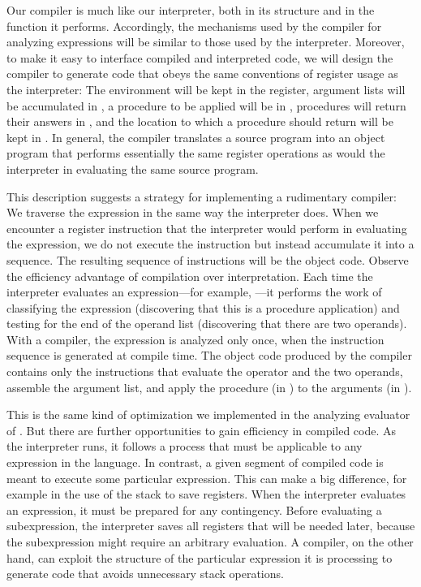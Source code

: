 Our compiler is much like our interpreter, both in its structure and in the function it performs.
Accordingly, the mechanisms used by the compiler for analyzing expressions will be similar to those used by the interpreter.
Moreover, to make it easy to interface compiled and interpreted code, we will design the compiler to generate code that obeys the same conventions of register usage as the interpreter:
The environment will be kept in the  register, argument lists will be accumulated in , a procedure to be applied will be in , procedures will return their answers in , and the location to which a procedure should return will be kept in .
In general, the compiler translates a source program into an object program that performs essentially the same register operations as would the interpreter in evaluating the same source program.

This description suggests a strategy for implementing a rudimentary compiler:
We traverse the expression in the same way the interpreter does.
When we encounter a register instruction that the interpreter would perform in evaluating the expression, we do not execute the instruction but instead accumulate it into a sequence.
The resulting sequence of instructions will be the object code.
Observe the efficiency advantage of compilation over interpretation.
Each time the interpreter evaluates an expression---for example, ---it performs the work of classifying the expression (discovering that this is a procedure application) and testing for the end of the operand list (discovering that there are two operands).
With a compiler, the expression is analyzed only once, when the instruction sequence is generated at compile time.
The object code produced by the compiler contains only the instructions that evaluate the operator and the two operands, assemble the argument list, and apply the procedure (in ) to the arguments (in ).

This is the same kind of optimization we implemented in the analyzing evaluator of .
But there are further opportunities to gain efficiency in compiled code.
As the interpreter runs, it follows a process that must be applicable to any expression in the language.
In contrast, a given segment of compiled code is meant to execute some particular expression.
This can make a big difference, for example in the use of the stack to save registers.
When the interpreter evaluates an expression, it must be prepared for any contingency.
Before evaluating a subexpression, the interpreter saves all registers that will be needed later, because the subexpression might require an arbitrary evaluation.
A compiler, on the other hand, can exploit the structure of the particular expression it is processing to generate code that avoids unnecessary stack operations.

